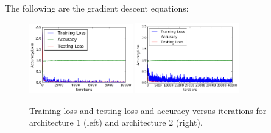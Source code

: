 \documentclass[5pt]{article}
\begin{document}
The following are the gradient descent equations:

\begin{figure}[T]
  \centering{}
  \includegraphics[width=0.4\textwidth]{images/mnist_learning1.png}
  \includegraphics[width=0.4\textwidth]{images/mnist_learning2.png}
  \caption{Training loss and testing loss and accuracy versus iterations for
  architecture 1 (left) and architecture 2 (right).}
\label{fig:mnist_learning}
\end{figure}
\end{document}
